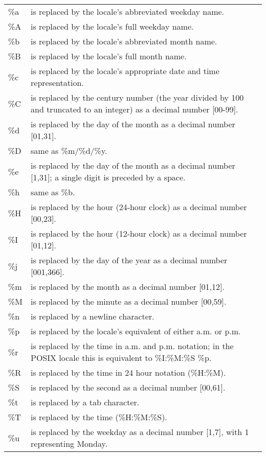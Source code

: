 \begin{center}
\begin{tabularx}{\linewidth}{lX}
\%a & is replaced by the locale's abbreviated weekday name. \\
\%A & is replaced by the locale's full weekday name. \\
\%b & is replaced by the locale's abbreviated month name. \\
\%B & is replaced by the locale's full month name. \\
\%c & is replaced by the locale's appropriate date and time representation. \\
\%C & is replaced by the century number (the year divided by 100 and truncated to an integer) as a decimal number [00-99]. \\
\%d & is replaced by the day of the month as a decimal number [01,31]. \\
\%D & same as \%m/\%d/\%y. \\
\%e & is replaced by the day of the month as a decimal number [1,31]; a single digit is preceded by a space. \\
\%h & same as \%b. \\
\%H & is replaced by the hour (24-hour clock) as a decimal number [00,23]. \\
\%I & is replaced by the hour (12-hour clock) as a decimal number [01,12]. \\
\%j & is replaced by the day of the year as a decimal number [001,366]. \\
\%m & is replaced by the month as a decimal number [01,12]. \\
\%M & is replaced by the minute as a decimal number [00,59]. \\
\%n & is replaced by a newline character. \\
\%p & is replaced by the locale's equivalent of either a.m. or p.m. \\
\%r & is replaced by the time in a.m. and p.m. notation; in the POSIX locale this is equivalent to \%I:\%M:\%S \%p. \\
\%R & is replaced by the time in 24 hour notation (\%H:\%M). \\
\%S & is replaced by the second as a decimal number [00,61]. \\
\%t & is replaced by a tab character. \\
\%T & is replaced by the time (\%H:\%M:\%S). \\
\%u & is replaced by the weekday as a decimal number [1,7], with 1 representing Monday. \\

\end{tabularx}
\end{center}
